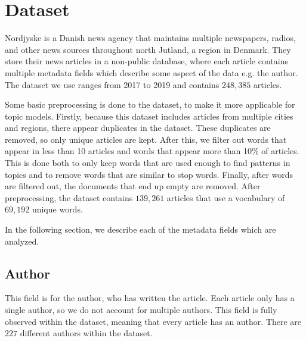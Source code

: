 \section{Dataset}\label{sec:dataset}
Nordjyske is a Danish news agency that maintains multiple newspapers, radios, and other news sources throughout north Jutland, a region in Denmark.
They store their news articles in a non-public database, where each article contains multiple metadata fields which describe some aspect of the data e.g. the author.
The dataset we use ranges from 2017 to 2019 and contains $248,385$ articles.

Some basic preprocessing is done to the dataset, to make it more applicable for topic models.
Firstly, because this dataset includes articles from multiple cities and regions, there appear duplicates in the dataset.
These duplicates are removed, so only unique articles are kept.
After this, we filter out words that appear in less than 10 articles and words that appear more than 10$\%$ of articles.
This is done both to only keep words that are used enough to find patterns in topics and to remove words that are similar to stop words.
Finally, after words are filtered out, the documents that end up empty are removed.
After preprocessing, the dataset contains $139,261$ articles that use a vocabulary of $69,192$ unique words.

In the following section, we describe each of the metadata fields which are analyzed.

\subsection{Author}
This field is for the author, who has written the article.
Each article only has a single author, so we do not account for multiple authors.
This field is fully observed within the dataset, meaning that every article has an author.
There are $227$ different authors within the dataset.

